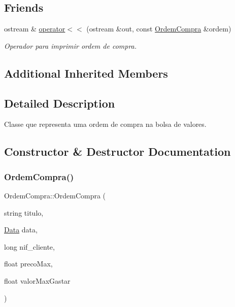 \subsection*{Friends}
\begin{DoxyCompactItemize}
\item 
ostream \& \hyperlink{class_ordem_compra_af2f3323b475ba777c890c63648d24e5d}{operator$<$$<$} (ostream \&out, const \hyperlink{class_ordem_compra}{Ordem\+Compra} \&ordem)
\begin{DoxyCompactList}\small\item\em Operador para imprimir ordem de compra. \end{DoxyCompactList}\end{DoxyCompactItemize}
\subsection*{Additional Inherited Members}


\subsection{Detailed Description}
Classe que representa uma ordem de compra na bolsa de valores. 

\subsection{Constructor \& Destructor Documentation}
\hypertarget{class_ordem_compra_a98bff4c9185593d197e72a7f14e5856f}{}\label{class_ordem_compra_a98bff4c9185593d197e72a7f14e5856f} 
\subsubsection{\texorpdfstring{Ordem\+Compra()}{OrdemCompra()}}
{\footnotesize\ttfamily Ordem\+Compra\+::\+Ordem\+Compra (\begin{DoxyParamCaption}\item[{string}]{titulo,  }\item[{\hyperlink{class_data}{Data}}]{data,  }\item[{long}]{nif\+\_\+cliente,  }\item[{float}]{preco\+Max,  }\item[{float}]{valor\+Max\+Gastar }\end{DoxyParamCaption})}



